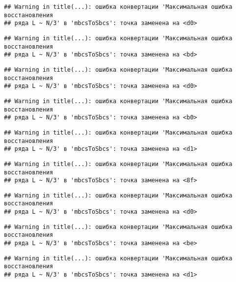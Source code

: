 \documentclass[
]{article}
\begin{document}
\begin{verbatim}
## Warning in title(...): ошибка конвертации 'Максимальная ошибка восстановления
## ряда L ~ N/3' в 'mbcsToSbcs': точка заменена на <d0>
\end{verbatim}

\begin{verbatim}
## Warning in title(...): ошибка конвертации 'Максимальная ошибка восстановления
## ряда L ~ N/3' в 'mbcsToSbcs': точка заменена на <bd>
\end{verbatim}

\begin{verbatim}
## Warning in title(...): ошибка конвертации 'Максимальная ошибка восстановления
## ряда L ~ N/3' в 'mbcsToSbcs': точка заменена на <d0>
\end{verbatim}

\begin{verbatim}
## Warning in title(...): ошибка конвертации 'Максимальная ошибка восстановления
## ряда L ~ N/3' в 'mbcsToSbcs': точка заменена на <b0>
\end{verbatim}

\begin{verbatim}
## Warning in title(...): ошибка конвертации 'Максимальная ошибка восстановления
## ряда L ~ N/3' в 'mbcsToSbcs': точка заменена на <d1>
\end{verbatim}

\begin{verbatim}
## Warning in title(...): ошибка конвертации 'Максимальная ошибка восстановления
## ряда L ~ N/3' в 'mbcsToSbcs': точка заменена на <8f>
\end{verbatim}

\begin{verbatim}
## Warning in title(...): ошибка конвертации 'Максимальная ошибка восстановления
## ряда L ~ N/3' в 'mbcsToSbcs': точка заменена на <d0>
\end{verbatim}

\begin{verbatim}
## Warning in title(...): ошибка конвертации 'Максимальная ошибка восстановления
## ряда L ~ N/3' в 'mbcsToSbcs': точка заменена на <be>
\end{verbatim}

\begin{verbatim}
## Warning in title(...): ошибка конвертации 'Максимальная ошибка восстановления
## ряда L ~ N/3' в 'mbcsToSbcs': точка заменена на <d1>
\end{verbatim}
\end{document}
